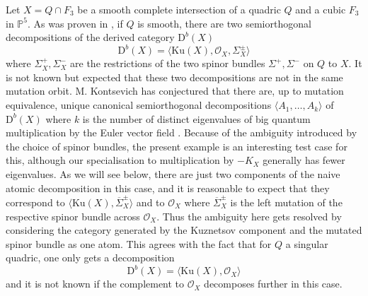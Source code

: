 \documentclass[11pt]{amsart}
\theoremstyle{plain}
\numberwithin{equation}{section}
\theoremstyle{definition}
\theoremstyle{remark}
\renewcommand{\P}{\mathbb P}
\begin{document}
Let $X= Q \cap F_3$ be a smooth complete intersection of a quadric $Q$ and a cubic $F_3$ in $\P^5$. As was proven in \cite[Prop. 4.2]{KS25}, if $Q$ is smooth, there are two semiorthogonal decompositions of the derived category $\mathrm{D}^b (X)$
\[
\mathrm{D}^b (X) = \big\langle  \mathrm{Ku}(X), \mathcal{O}_X, \Sigma^{\pm}_X \big\rangle 
\]
where $\Sigma^+_X, \Sigma^-_X$ are the restrictions of the two spinor bundles $\Sigma^+, \Sigma^-$ on $Q$ to $X$. It is not known but expected that these two decompositions are not in the same mutation orbit. M. Kontsevich has conjectured that there are, up to mutation equivalence, unique canonical semiorthogonal decompositions $\langle A_1,\dots,A_k \rangle $ of $\mathrm{D}^b(X)$ where $k$ is the number of distinct eigenvalues of big quantum multiplication by the Euler vector field \cite[Conjecture 1]{ESS25}. Because of the ambiguity introduced by the choice of spinor bundles, the present example is an interesting test case for this, although our specialisation to multiplication by $-K_X$ generally has fewer eigenvalues. As we will see below, there are just two components of the naive atomic decomposition in this case, and it is reasonable to expect that they correspond to $\langle \mathrm{Ku}(X), \overline{\Sigma}_X^{\pm}\rangle$ and to $ \mathcal{O}_X $ where $\overline{\Sigma}_X^{\pm}$ is the left mutation of the respective spinor bundle across $\mathcal{O}_X$. Thus the ambiguity here gets resolved by considering the category generated by the Kuznetsov component and the mutated spinor bundle as one atom. This agrees with the fact that for $Q$ a singular quadric, one only gets a decomposition
\[
\mathrm{D}^b (X) = \big\langle  \mathrm{Ku}(X), \mathcal{O}_X \big\rangle 
\]
and it is not known if the complement to $\mathcal{O}_X$ decomposes further in this case. 
\end{document}

